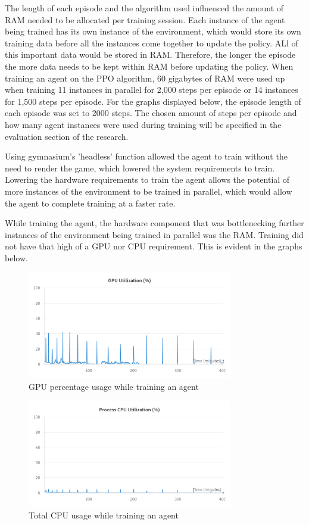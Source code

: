 The length of each episode and the algorithm used influenced the amount of RAM needed to be allocated per training session. Each instance of the agent being trained has its own instance of the environment, which would store its own training data before all the instances come together to update the policy. ALl of this important data would be stored in RAM. Therefore, the longer the episode the more data needs to be kept within RAM before updating the policy. When training an agent on the PPO algorithm, 60 gigabytes of RAM were used up when training 11 instances in parallel for 2,000 steps per episode or 14 instances for 1,500 steps per episode. For the graphs displayed below, the episode length of each episode was set to 2000 steps. The chosen amount of steps per episode and how many agent instances were used during training will be specified in the evaluation section of the research. 

Using gymnasium's 'headless' function allowed the agent to train without the need to render the game, which lowered the system requirements to train. Lowering the hardware requirements to train the agent allows the potential of more instances of the environment to be trained in parallel, which would allow the agent to complete training at a faster rate.

While training the agent, the hardware component that was bottlenecking further instances of the environment being trained in parallel was the RAM. Training did not have that high of a GPU nor CPU requirement. This is evident in the graphs below. 

\begin{figure}[H]
    \centering
    \includegraphics[width=0.8\textwidth]{figures/GPU_Utilization.png}
    \caption{GPU percentage usage while training an agent}
    \label{fig:gpu_memory_usage}
\end{figure}

\begin{figure}[H]
    \centering
    \includegraphics[width=0.8\textwidth]{figures/total_cpu_utilization.png}
    \caption{Total CPU usage while training an agent}
    \label{fig:ram_usage}
\end{figure}

